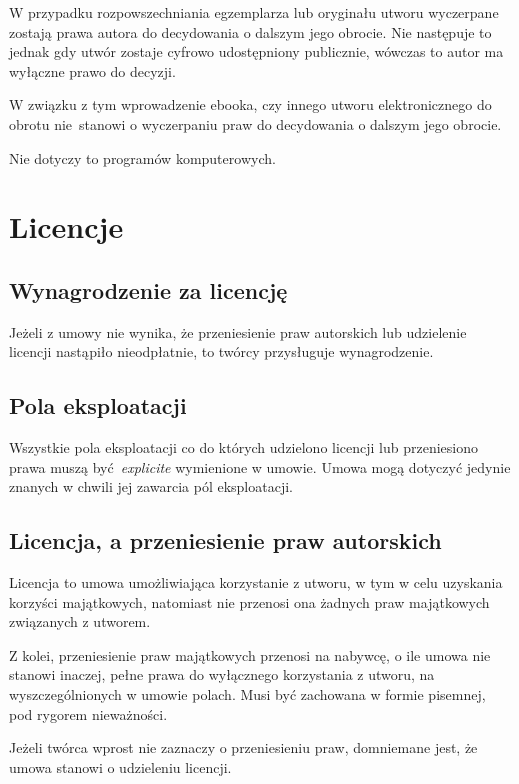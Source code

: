 \documentclass{article}
\begin{document}
W przypadku rozpowszechniania egzemplarza lub oryginału utworu wyczerpane zostają prawa autora do decydowania o dalszym jego obrocie.
Nie następuje to jednak gdy utwór zostaje cyfrowo udostępniony publicznie, wówczas to autor ma wyłączne prawo do decyzji.

W związku z tym wprowadzenie ebooka, czy innego utworu elektronicznego do obrotu nie~stanowi o wyczerpaniu praw do decydowania o dalszym jego obrocie.

Nie dotyczy to programów komputerowych.

\newpage

\section{Licencje}

\subsection{Wynagrodzenie za licencję}

Jeżeli z umowy nie wynika, że przeniesienie praw autorskich lub udzielenie licencji nastąpiło nieodpłatnie, to twórcy przysługuje wynagrodzenie.

\subsection{Pola eksploatacji}

Wszystkie pola eksploatacji co do których udzielono licencji lub przeniesiono prawa muszą być~\textit{explicite} wymienione w umowie. Umowa mogą dotyczyć jedynie znanych w chwili jej zawarcia pól eksploatacji.

\subsection{Licencja, a przeniesienie praw autorskich}

Licencja to umowa umożliwiająca korzystanie z utworu, w tym w celu uzyskania korzyści majątkowych, natomiast nie przenosi ona żadnych praw majątkowych związanych z utworem.

Z kolei, przeniesienie praw majątkowych przenosi na nabywcę, o ile umowa nie stanowi inaczej, pełne prawa do wyłącznego korzystania z utworu, na wyszczególnionych w umowie polach. Musi być zachowana w formie pisemnej, pod rygorem nieważności.

Jeżeli twórca wprost nie zaznaczy o przeniesieniu praw, domniemane jest, że umowa stanowi o udzieleniu licencji.
\end{document}
